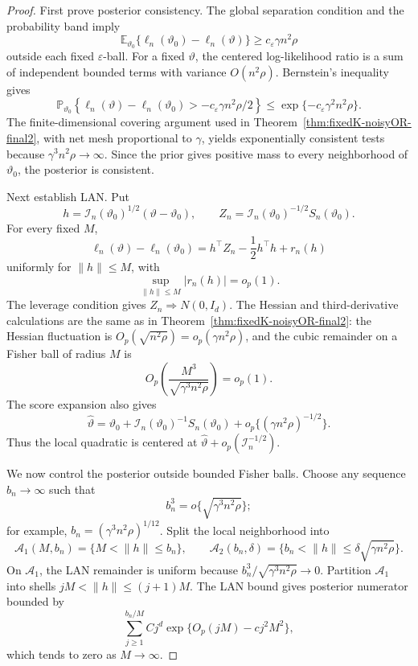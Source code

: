 \documentclass[12pt]{article}
\newcommand{\1}{\mathbf{1}}
\providecommand{\Pb}{\mathbb P}
\providecommand{\Eb}{\mathbb E}
\providecommand{\calI}{\mathcal I}
\begin{document}
\begin{proof}
First prove posterior consistency.  The global separation condition and
the probability band imply
\[
  \Eb_{\vartheta_0}\{\ell_n(\vartheta_0)-\ell_n(\vartheta)\}
  \ge c_\varepsilon\gamma n^2\rho
\]
outside each fixed \(\varepsilon\)-ball.  For a fixed \(\vartheta\), the
centered log-likelihood ratio is a sum of independent bounded terms with
variance \(O(n^2\rho)\).  Bernstein's inequality gives
\[
  \Pb_{\vartheta_0}
  \left\{
    \ell_n(\vartheta)-\ell_n(\vartheta_0)
    >
    -c_\varepsilon\gamma n^2\rho/2
  \right\}
  \le
  \exp\{-c_\varepsilon\gamma^2 n^2\rho\}.
\]
The finite-dimensional covering argument used in
Theorem~\ref{thm:fixedK-noisyOR-final2}, with net mesh proportional to
\(\gamma\), yields exponentially consistent tests because
\(\gamma^3n^2\rho\to\infty\).  Since the prior gives positive mass to
every neighborhood of \(\vartheta_0\), the posterior is consistent.

Next establish LAN.  Put
\[
  h=\calI_n(\vartheta_0)^{1/2}(\vartheta-\vartheta_0),
  \qquad
  Z_n=\calI_n(\vartheta_0)^{-1/2}S_n(\vartheta_0).
\]
For every fixed \(M\),
\[
  \ell_n(\vartheta)-\ell_n(\vartheta_0)
  =
  h^\top Z_n-\frac12h^\top h+r_n(h)
\]
uniformly for \(\|h\|\le M\), with
\[
  \sup_{\|h\|\le M}|r_n(h)|=o_p(1).
\]
The leverage condition gives \(Z_n\Rightarrow N(0,I_d)\).  The Hessian
and third-derivative calculations are the same as in
Theorem~\ref{thm:fixedK-noisyOR-final2}: the Hessian fluctuation is
\(O_p(\sqrt{n^2\rho})=o_p(\gamma n^2\rho)\), and the cubic remainder on
a Fisher ball of radius \(M\) is
\[
  O_p\!\left(\frac{M^3}{\sqrt{\gamma^3n^2\rho}}\right)=o_p(1).
\]
The score expansion also gives
\[
  \widehat\vartheta
  =
  \vartheta_0+\calI_n(\vartheta_0)^{-1}S_n(\vartheta_0)
  +o_p\{(\gamma n^2\rho)^{-1/2}\}.
\]
Thus the local quadratic is centered at
\(\widehat\vartheta+o_p(\calI_n^{-1/2})\).

We now control the posterior outside bounded Fisher balls.  Choose any
sequence \(b_n\to\infty\) such that
\[
  b_n^3=o\{\sqrt{\gamma^3n^2\rho}\};
\]
for example, \(b_n=(\gamma^3n^2\rho)^{1/12}\).  Split the local
neighborhood into
\[
  \mathcal A_1(M,b_n)=\{M<\|h\|\le b_n\},
  \qquad
  \mathcal A_2(b_n,\delta)=
  \{b_n<\|h\|\le \delta\sqrt{\gamma n^2\rho}\}.
\]
On \(\mathcal A_1\), the LAN remainder is uniform because
\(b_n^3/\sqrt{\gamma^3n^2\rho}\to0\).  Partition
\(\mathcal A_1\) into shells \(jM<\|h\|\le(j+1)M\).  The LAN bound gives
posterior numerator bounded by
\[
  \sum_{j\ge1}^{b_n/M}
  Cj^d\exp\{O_p(jM)-c j^2M^2\},
\]
which tends to zero as \(M\to\infty\).


\end{proof}
\end{document}
